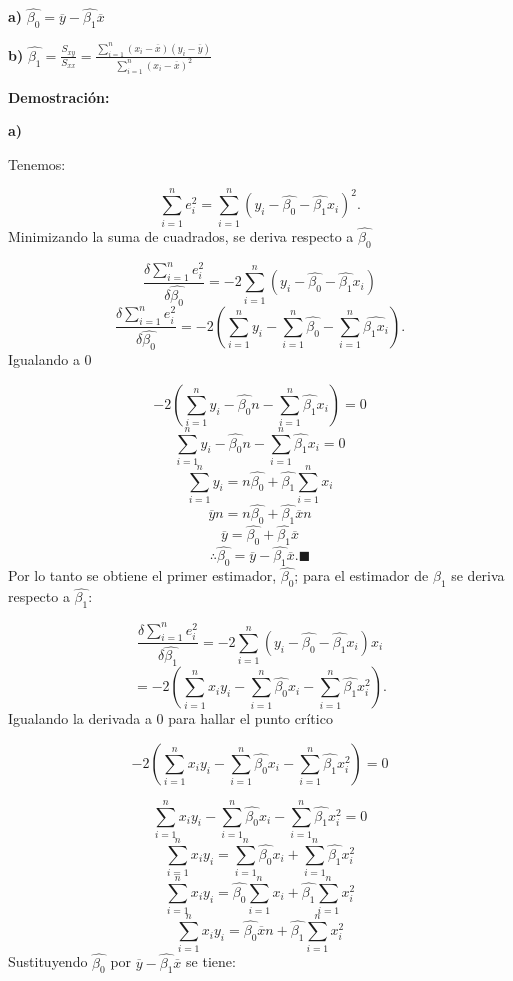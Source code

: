 \documentclass[a4paper,oneside,openany]{book}
\begin{document}
\textbf{a)} \(\hat{\beta_{0}}=\overline{y}-\hat{\beta_{1}}\overline{x}\)

\textbf{b)}
\(\hat{\beta_{1}}=\frac{S_{xy}}{S_{xx}}=\frac{\sum_{i=1}^{n}(x_{i}-\overline{x})(y_{i}-\overline{y})}{\sum_{i=1}^{n}(x_{i}-\overline{x})^2}\)

\textbf{Demostración:}

\textbf{a)}

Tenemos:

\[\sum_{i=1}^{n}e_{i}^2=\sum_{i=1}^{n}(y_{i}-\hat{\beta_{0}}-\hat{\beta_{1}}x_{i})^2.\]
Minimizando la suma de cuadrados, se deriva respecto a
\(\hat{\beta_{0}}\)

\[\frac{\delta\sum_{i=1}^{n}e_{i}^2}{\delta\hat{\beta_{0}}}=-2\sum_{i=1}^{n}(y_{i}-\hat{\beta_{0}}-\hat{\beta_{1}}x_{i})\]
\[\frac{\delta\sum_{i=1}^{n}e_{i}^2}{\delta\hat{\beta_{0}}}=-2\left(\sum_{i=1}^{n}y_{i}-\sum_{i=1}^{n}\hat{\beta_{0}}-\sum_{i=1}^{n}\hat{\beta_{1}x_{i}}\right).\]
Igualando a 0

\[-2\left(\sum_{i=1}^{n}y_{i}-\hat{\beta_{0}}n-\sum_{i=1}^{n}\hat{\beta_{1}}x_{i}\right)=0\]
\[\sum_{i=1}^{n}y_{i}-\hat{\beta_{0}}n-\sum_{i=1}^{n}\hat{\beta_{1}}x_{i}=0\]
\[\sum_{i=1}^{n}y_{i}=n\hat{\beta_{0}}+\hat{\beta_{1}}\sum_{i=1}^{n}x_{i}\]
\[\overline{y}n=n\hat{\beta_{0}}+\hat{\beta_{1}}\overline{x}n\]
\[\overline{y}=\hat{\beta_{0}}+\hat{\beta_{1}}\overline{x}\]
\[\therefore\hat{\beta_{0}}=\overline{y}-\hat{\beta_{1}}\overline{x}.\blacksquare\]
Por lo tanto se obtiene el primer estimador, \(\hat{\beta_{0}}\); para
el estimador de \(\beta_{1}\) se deriva respecto a \(\hat{\beta_{1}}\):

\[\frac{\delta\sum_{i=1}^{n}e_{i}^2}{\delta\hat{\beta_{1}}}=-2\sum_{i=1}^{n}(y_{i}-\hat{\beta_{0}}-\hat{\beta_{1}}x_{i})x_{i}\]
\[=-2\left(\sum_{i=1}^{n}x_{i}y_{i}-\sum_{i=1}^{n}\hat{\beta_{0}}x_{i}-\sum_{i=1}^{n}\hat{\beta_{1}}x_{i}^2\right).\]
Igualando la derivada a 0 para hallar el punto crítico

\[-2\left(\sum_{i=1}^{n}x_{i}y_{i}-\sum_{i=1}^{n}\hat{\beta_{0}}x_{i}-\sum_{i=1}^{n}\hat{\beta_{1}}x_{i}^2\right)=0\]

\[\sum_{i=1}^{n}x_{i}y_{i}-\sum_{i=1}^{n}\hat{\beta_{0}}x_{i}-\sum_{i=1}^{n}\hat{\beta_{1}}x_{i}^2=0\]
\[\sum_{i=1}^{n}x_{i}y_{i}=\sum_{i=1}^{n}\hat{\beta_{0}}x_{i}+\sum_{i=1}^{n}\hat{\beta_{1}}x_{i}^2\]
\[\sum_{i=1}^{n}x_{i}y_{i}=\hat{\beta_{0}}\sum_{i=1}^{n}x_{i}+\hat{\beta_{1}}\sum_{i=1}^{n}x_{i}^2\]
\[\sum_{i=1}^{n}x_{i}y_{i}=\hat{\beta_{0}}\overline{x}n+\hat{\beta_{1}}\sum_{i=1}^{n}x_{i}^2\]
Sustituyendo \(\hat{\beta_{0}}\) por
\(\overline{y}-\hat{\beta_{1}}\overline{x}\) se tiene:
\end{document}
